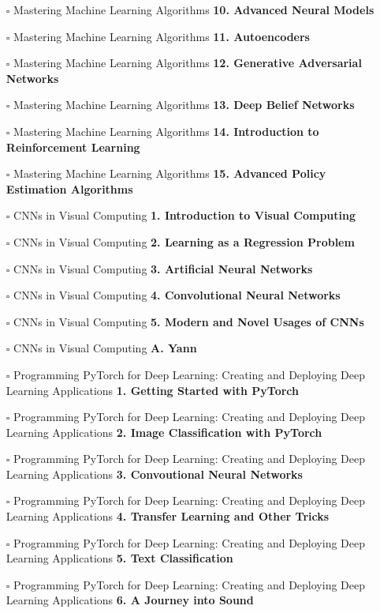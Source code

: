 \documentclass[a4, landscape, 12pt]{article}
\newcommand{\checkbox}{$\square$}%
\begin{document}
\begin{itemize}
{}
\item [\checkbox]  Mastering Machine Learning Algorithms \textbf{ 10. Advanced Neural Models
}
\item [\checkbox]  Mastering Machine Learning Algorithms \textbf{ 11. Autoencoders
}
\item [\checkbox]  Mastering Machine Learning Algorithms \textbf{ 12. Generative Adversarial Networks
}
\item [\checkbox]  Mastering Machine Learning Algorithms \textbf{ 13. Deep Belief Networks
}
\item [\checkbox]  Mastering Machine Learning Algorithms \textbf{ 14. Introduction to Reinforcement Learning
}
\item [\checkbox]  Mastering Machine Learning Algorithms \textbf{ 15. Advanced Policy Estimation Algorithms
}
\item [\checkbox]  CNNs in Visual Computing \textbf{ 1. Introduction to Visual Computing
}
\item [\checkbox]  CNNs in Visual Computing \textbf{ 2. Learning as a Regression Problem
}
\item [\checkbox]  CNNs in Visual Computing \textbf{ 3. Artificial Neural Networks
}
\item [\checkbox]  CNNs in Visual Computing \textbf{ 4. Convolutional Neural Networks
}
\item [\checkbox]  CNNs in Visual Computing \textbf{ 5. Modern and Novel Usages of CNNs
}
\item [\checkbox]  CNNs in Visual Computing \textbf{ A. Yann
}
\item [\checkbox]  Programming PyTorch for Deep Learning: Creating and Deploying Deep Learning Applications \textbf{ 1. Getting Started with PyTorch
}
\item [\checkbox]  Programming PyTorch for Deep Learning: Creating and Deploying Deep Learning Applications \textbf{ 2. Image Classification with PyTorch
}
\item [\checkbox]  Programming PyTorch for Deep Learning: Creating and Deploying Deep Learning Applications \textbf{ 3. Convoutional Neural Networks
}
\item [\checkbox]  Programming PyTorch for Deep Learning: Creating and Deploying Deep Learning Applications \textbf{ 4. Transfer Learning and Other Tricks
}
\item [\checkbox]  Programming PyTorch for Deep Learning: Creating and Deploying Deep Learning Applications \textbf{ 5. Text Classification
}
\item [\checkbox]  Programming PyTorch for Deep Learning: Creating and Deploying Deep Learning Applications \textbf{ 6. A Journey into Sound
}
\end{itemize}
\end{document}
